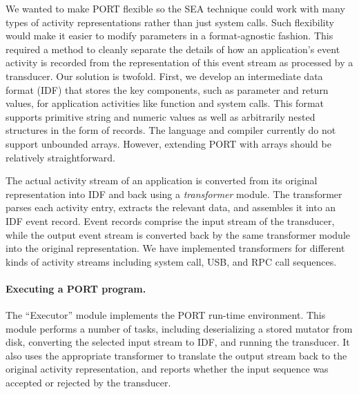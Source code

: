 We wanted to make PORT flexible so the SEA technique
could
work with many types of
activity representations rather than just system calls.
Such flexibility would make it easier to modify parameters in a format-agnostic fashion.
This required a method to cleanly separate the details of how
an application's event activity is recorded from the representation of this event stream as
processed by a transducer.
Our solution is twofold.  First, we develop an intermediate data format
(IDF) that
stores the key components, such as parameter and return values,
for application activities like function
and system calls.  This format supports primitive string and numeric
values as well as arbitrarily nested structures in the form of records.
The language and compiler currently do not support unbounded arrays. However, extending PORT with arrays should be relatively straightforward.


The actual activity stream of an application is converted from its original representation into IDF and
back using a \emph{transformer} module. The transformer parses each activity entry,
extracts the relevant data, and assembles it into an IDF
event record.  Event records comprise the input stream of the transducer, while 
the output event stream is converted back by the same transformer module
into the original  representation. We have implemented transformers for different kinds of activity streams including system call, USB, and RPC call sequences.

\paragraph{Executing a PORT program.}

The ``Executor'' module implements the PORT run-time environment.
This module performs a number of tasks, including deserializing a stored mutator from disk,
converting the selected input stream to IDF, and
running the transducer. It also
uses the appropriate transformer to translate the output stream back to the original activity representation, and reports whether the input sequence was
accepted or rejected by the transducer.

